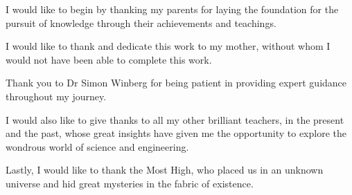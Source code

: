 I would like to begin by thanking my parents for laying the foundation for the pursuit of knowledge through their achievements and teachings. 

I would like to thank and dedicate this work to my mother, without whom I would not have been able to complete this work.

Thank you to Dr Simon Winberg for being patient in providing expert guidance throughout my journey.

I would also like to give thanks to all my other brilliant teachers, in the present and the past, whose great insights have given me the opportunity to explore the wondrous world of science and engineering. 

Lastly, I would like to thank the Most High, who placed us in an unknown universe and hid great mysteries in the fabric of existence.


